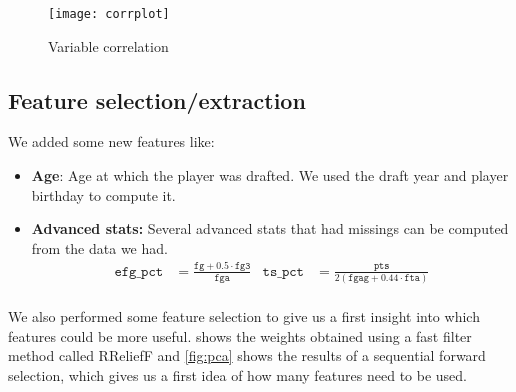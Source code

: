 \begin{figure}[H]
  \texttt{[image: corrplot]}
  \caption{Variable correlation}%
  \label{fig:corrplot}
\end{figure}

\subsection{Feature selection/extraction}%
\label{sub:feature-selection}

We added some new features like:
\begin{itemize}[topsep=0pt]
    \item \textbf{Age}: Age at which the player was drafted. We used the draft year and player birthday to compute it.
    \item \textbf{Advanced stats:} Several advanced stats that had missings can be computed from the data we had.
    \begin{align*}
    \texttt{efg\_pct} &= \frac{\texttt{fg} + 0.5 \cdot \texttt{fg3}}{\texttt{fga}}
  & \texttt{ts\_pct} &= \frac{\texttt{pts}}{2\left(\texttt{fgag} + 0.44 \cdot \texttt{fta}\right)} \\
    \end{align*}
\end{itemize}

We also performed some feature selection to give us a first insight into which features could be more useful.  shows the weights obtained using a fast filter method called RReliefF and \cref{fig:pca} shows the results of a sequential forward selection, which gives us a first idea of how many features need to be used.

